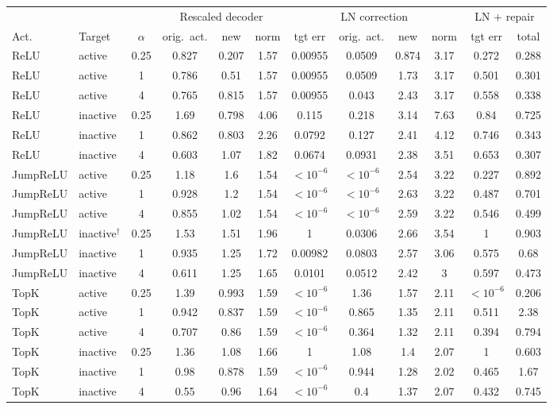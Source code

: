 \begin{tabular}{llc|ccc|cccc|cc}
\toprule
 & & & \multicolumn{3}{c|}{Rescaled decoder} & \multicolumn{4}{c|}{LN correction} & \multicolumn{2}{c}{LN + repair} \\
Act. & Target & $\alpha$ & orig.\ act. & new & norm & tgt err & orig.\ act. & new & norm & tgt err & total \\
\midrule
ReLU & active & 0.25 & 0.827 & 0.207 & 1.57 & 0.00955 & 0.0509 & 0.874 & 3.17 & 0.272 & 0.288 \\
ReLU & active & 1 & 0.786 & 0.51 & 1.57 & 0.00955 & 0.0509 & 1.73 & 3.17 & 0.501 & 0.301 \\
ReLU & active & 4 & 0.765 & 0.815 & 1.57 & 0.00955 & 0.043 & 2.43 & 3.17 & 0.558 & 0.338 \\
ReLU & inactive & 0.25 & 1.69 & 0.798 & 4.06 & 0.115 & 0.218 & 3.14 & 7.63 & 0.84 & 0.725 \\
ReLU & inactive & 1 & 0.862 & 0.803 & 2.26 & 0.0792 & 0.127 & 2.41 & 4.12 & 0.746 & 0.343 \\
ReLU & inactive & 4 & 0.603 & 1.07 & 1.82 & 0.0674 & 0.0931 & 2.38 & 3.51 & 0.653 & 0.307 \\
\midrule
JumpReLU & active & 0.25 & 1.18 & 1.6 & 1.54 & $<\!10^{-6}$ & $<\!10^{-6}$ & 2.54 & 3.22 & 0.227 & 0.892 \\
JumpReLU & active & 1 & 0.928 & 1.2 & 1.54 & $<\!10^{-6}$ & $<\!10^{-6}$ & 2.63 & 3.22 & 0.487 & 0.701 \\
JumpReLU & active & 4 & 0.855 & 1.02 & 1.54 & $<\!10^{-6}$ & $<\!10^{-6}$ & 2.59 & 3.22 & 0.546 & 0.499 \\
JumpReLU & inactive$^\dagger$ & 0.25 & 1.53 & 1.51 & 1.96 & 1 & 0.0306 & 2.66 & 3.54 & 1 & 0.903 \\
JumpReLU & inactive & 1 & 0.935 & 1.25 & 1.72 & 0.00982 & 0.0803 & 2.57 & 3.06 & 0.575 & 0.68 \\
JumpReLU & inactive & 4 & 0.611 & 1.25 & 1.65 & 0.0101 & 0.0512 & 2.42 & 3 & 0.597 & 0.473 \\
\midrule
TopK & active & 0.25 & 1.39 & 0.993 & 1.59 & $<\!10^{-6}$ & 1.36 & 1.57 & 2.11 & $<\!10^{-6}$ & 0.206 \\
TopK & active & 1 & 0.942 & 0.837 & 1.59 & $<\!10^{-6}$ & 0.865 & 1.35 & 2.11 & 0.511 & 2.38 \\
TopK & active & 4 & 0.707 & 0.86 & 1.59 & $<\!10^{-6}$ & 0.364 & 1.32 & 2.11 & 0.394 & 0.794 \\
TopK & inactive & 0.25 & 1.36 & 1.08 & 1.66 & 1 & 1.08 & 1.4 & 2.07 & 1 & 0.603 \\
TopK & inactive & 1 & 0.98 & 0.878 & 1.59 & $<\!10^{-6}$ & 0.944 & 1.28 & 2.02 & 0.465 & 1.67 \\
TopK & inactive & 4 & 0.55 & 0.96 & 1.64 & $<\!10^{-6}$ & 0.4 & 1.37 & 2.07 & 0.432 & 0.745 \\
\bottomrule
\end{tabular}
